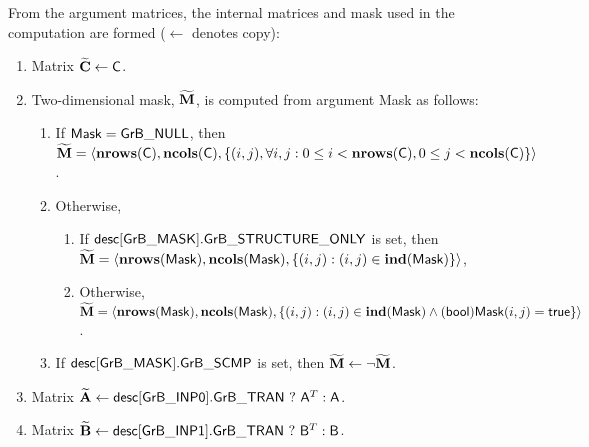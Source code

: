 From the argument matrices, the internal matrices and mask used in 
the computation are formed ($\leftarrow$ denotes copy):
\begin{enumerate}
	\item Matrix ${\bf \widetilde{C}} \leftarrow {\sf C}$.

	\item Two-dimensional mask, ${\bf \widetilde{M}}$, is computed from
    argument {\sf Mask} as follows:
	\begin{enumerate}
		\item	If ${\sf Mask} = {\sf GrB\_NULL}$, then ${\bf \widetilde{M}} = 
        \langle \bold{nrows}({\sf C}), \bold{ncols}({\sf C}), \{(i,j), 
        \forall i,j : 0 \leq i <  \bold{nrows}({\sf C}), 0 \leq j < 
        \bold{ncols}({\sf C}) \} \rangle$.

		\item Otherwise, 
        \begin{enumerate}
            \item If ${\sf desc[GrB\_MASK].GrB\_STRUCTURE\_ONLY}$ is set, then
            ${\bf \widetilde{M}} = \langle \bold{nrows}({\sf Mask}), 
            \bold{ncols}({\sf Mask}), \{(i,j) : (i,j) \in \bold{ind}({\sf Mask}) \} \rangle$,
            \item Otherwise, ${\bf \widetilde{M}} = \langle \bold{nrows}({\sf Mask}), 
            \bold{ncols}({\sf Mask}), \{(i,j) : (i,j) \in \bold{ind}({\sf Mask}) \wedge 
            ({\sf bool}){\sf Mask}(i,j) = {\sf true}\} \rangle$.
        \end{enumerate}
		\item	If ${\sf desc[GrB\_MASK].GrB\_SCMP}$ is set, then 
        ${\bf \widetilde{M}} \leftarrow \neg {\bf \widetilde{M}}$.
	\end{enumerate}

	\item Matrix ${\bf \widetilde{A}} \leftarrow
    {\sf desc[GrB\_INP0].GrB\_TRAN} \ ? \ {\sf A}^T : {\sf A}$.

	\item Matrix ${\bf \widetilde{B}} \leftarrow
    {\sf desc[GrB\_INP1].GrB\_TRAN} \ ? \ {\sf B}^T : {\sf B}$.
\end{enumerate}


